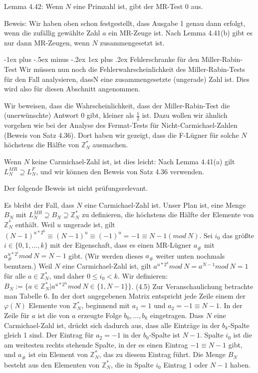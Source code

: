 \documentclass[a4paper]{article}
\makeatletter
\renewcommand{\subsubsection}{\@startsection{subsubsection}{3}{0mm}%
 {-1ex plus -.5ex minus -.2ex}%
 {1ex plus .2ex}%
 {\normalfont\small\bfseries}}
\makeatother
\begin{document}
\begin{multicols}{3}
        Lemma 4.42: Wenn $N$ eine Primzahl ist, gibt der MR-Test $0$ aus.

        Beweis: Wir haben oben schon festgestellt, dass Ausgabe 1 genau dann erfolgt, wenn die zufällig gewählte Zahl $a$ ein MR-Zeuge ist. Nach Lemma 4.41(b) gibt es nur dann
        MR-Zeugen, wenn $N$ zusammengesetzt ist.

        \subsubsection{Fehlerschranke für den Miller-Rabin-Test}
        Wir müssen nun noch die Fehlerwahrscheinlichkeit des Miller-Rabin-Tests für den Fall analysieren, dassN eine zusammengesetzte (ungerade) Zahl ist. Dies wird also für diesen Abschnitt angenommen.

        Wir beweisen, dass die Wahrscheinlichkeit, dass der Miller-Rabin-Test die (unerwünschte) Antwort $0$ gibt, kleiner als $\frac{1}{2}$ ist. Dazu wollen wir ähnlich vorgehen wie bei der Analyse des Fermat-Tests für Nicht-Carmichael-Zahlen (Beweis von Satz 4.36). Dort haben wir gezeigt, dass die F-Lügner für solche $N$ höchstens die Hälfte von $\mathbb{Z}^*_N$ ausmachen.

        Wenn $N$ keine Carmichael-Zahl ist, ist dies leicht: Nach Lemma 4.41(a) gilt $L^{MR}_N \supseteq L^F_N$, und wir können den Beweis von Satz 4.36 verwenden.

        Der folgende Beweis ist nicht prüfungsrelevant.

        Es bleibt der Fall, dass $N$ eine Carmichael-Zahl ist. Unser Plan ist, eine Menge $B_N$ mit $L^{MR}_N \supseteq B_N \supseteq \mathbb{Z}^*_N$ zu definieren, die höchstens die Hälfte der Elemente von $\mathbb{Z}^*_N$ enthält. Weil $u$ ungerade ist, gilt $(N-1)^{u*2^0} \equiv (N-1)^u\equiv (-1)^u= -1 \equiv N-1 (mod\ N)$. Sei $i_0$ das größte $i\in\{0,1,...,k\}$ mit der Eigenschaft, dass es einen MR-Lügner $a_{\#}$ mit $a_{\#}^{u*2^i} mod\ N =N-1$ gibt. (Wir werden dieses $a_{\#}$ weiter unten nochmals benutzen.) Weil $N$ eine Carmichael-Zahl ist, gilt $a^{u*2^k} mod\ N=a^{N-1} mod\ N= 1$ für alle $a\in\mathbb{Z}^*_N$, und daher $0\leq i_0 < k$. Wir definieren: $B_N:=\{a\in\mathbb{Z}^*_N | a^{u*2^{i_0}} mod\ N\in\{1,N-1\}\}$. (4.5)
        Zur Veranschaulichung betrachte man Tabelle 6. In der dort angegebenen Matrix entspricht jede Zeile einem der $\varphi(N)$ Elemente von $\mathbb{Z}^*_N$, beginnend mit $a_1 = 1$ und $a_2=-1 \equiv N-1$. In der Zeile für $a$ ist die von $a$ erzeugte Folge $b_0,...,b_k$ eingetragen. Dass $N$ eine Carmichael-Zahl ist, drückt sich dadurch aus, dass alle Einträge in der $b_k$-Spalte gleich 1 sind. Der Eintrag für $a_2=-1$ in der $b_0$-Spalte ist $N-1$. Spalte $i_0$ ist die am weitesten rechts stehende Spalte, in der es einen Eintrag $-1 \equiv N-1$ gibt, und $a_{\#}$ ist ein Element von $\mathbb{Z}^*_N$, das zu diesem Eintrag führt. Die Menge $B_N$ besteht aus den Elementen von $\mathbb{Z}^*_N$, die in Spalte $i_0$ Eintrag $1$ oder $N-1$ haben.


\end{multicols}
\end{document}
